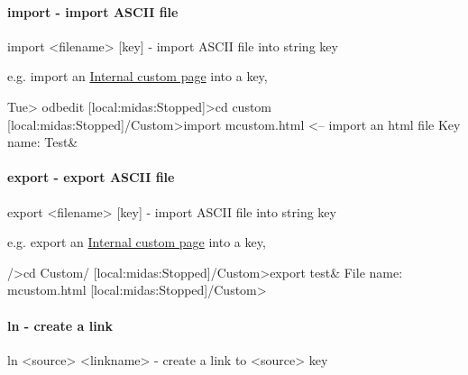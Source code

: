 \hypertarget{RC_odbedit_examples_RC_odbedit_import}{}\paragraph{import -\/  import ASCII file}\label{RC_odbedit_examples_RC_odbedit_import}

\begin{DoxyCode}
import  <filename> [key]    - import ASCII file into string key 
\end{DoxyCode}


e.g. import an \hyperlink{RC_mhttpd_Internal}{Internal custom page} into a key, 
\begin{DoxyCode}
Tue> odbedit
[local:midas:Stopped]>cd custom
[local:midas:Stopped]/Custom>import mcustom.html   <-- import an html file
  Key name: Test&  
\end{DoxyCode}




\hypertarget{RC_odbedit_examples_RC_odbedit_export}{}\paragraph{export -\/  export ASCII file}\label{RC_odbedit_examples_RC_odbedit_export}

\begin{DoxyCode}
export  <filename> [key]    - import ASCII file into string key 
\end{DoxyCode}


e.g. export an \hyperlink{RC_mhttpd_Internal}{Internal custom page} into a key,


\begin{DoxyCode}
  />cd Custom/
  [local:midas:Stopped]/Custom>export test&
  File name: mcustom.html
  [local:midas:Stopped]/Custom>
\end{DoxyCode}




\hypertarget{RC_odbedit_examples_RC_odbedit_ln}{}\paragraph{ln -\/ create a link}\label{RC_odbedit_examples_RC_odbedit_ln}

\begin{DoxyCode}
ln <source> <linkname>  - create a link to <source> key
\end{DoxyCode}


